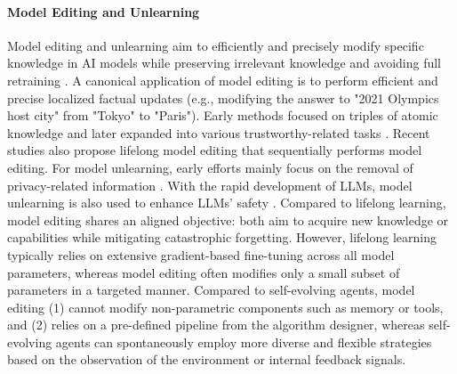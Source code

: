 \documentclass[10pt]{article} %
\begin{document}
\paragraph{Model Editing and Unlearning}
Model editing and unlearning aim to efficiently and precisely modify specific knowledge in AI models while preserving irrelevant knowledge and avoiding full retraining \citep{wang2024knowledge, wang2025comprehensive, zhang2024comprehensive, wang2025comprehensive, nguyen2022survey, geng2025comprehensive}. A canonical application of model editing is to perform efficient and precise localized factual updates (e.g., modifying the answer to "2021 Olympics host city" from "Tokyo" to "Paris"). Early methods focused on triples of atomic knowledge and later expanded into various trustworthy-related tasks \citep{fang2025alphaedit, huang2025model}. Recent studies also propose lifelong model editing\citep{chen2024lifelong} that sequentially performs model editing.
For model unlearning, early efforts mainly focus on the removal of privacy-related information \citep{chen2021machine}. With the rapid development of LLMs, model unlearning is also used to enhance LLMs' safety \citep{safe_unlearning, li2024wmdp, circuit_breaker, lu2025x}. 
Compared to lifelong learning, model editing shares an aligned objective: both aim to acquire new knowledge or capabilities while mitigating catastrophic forgetting. However, lifelong learning typically relies on extensive gradient-based fine-tuning across all model parameters, whereas model editing often modifies only a small subset of parameters in a targeted manner.
Compared to self-evolving agents, model editing (1) cannot modify non-parametric components such as memory or tools, and (2) relies on a pre-defined pipeline from the algorithm designer, whereas self-evolving agents can spontaneously employ more diverse and flexible strategies based on the observation of the environment or internal feedback signals.
\end{document}
